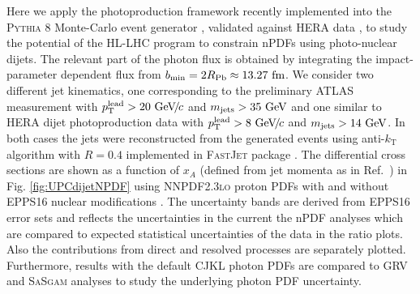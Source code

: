 \documentclass[../report.tex]{subfiles}
\begin{document}
Here we apply the photoproduction framework recently implemented into the \textsc{Pythia 8} Monte-Carlo event generator \cite{Sjostrand:2014zea}, validated against HERA data \cite{Helenius:2018bai}, to study the potential of the HL-LHC program to constrain nPDFs using photo-nuclear dijets. The relevant part of the photon flux is obtained by integrating the impact-parameter dependent flux from $b_{\mathrm{min}}=2 R_{\mathrm{Pb}} \approx 13.27~\text{fm}$. We consider two different jet kinematics, one corresponding to the preliminary ATLAS measurement \cite{ATLAS:2017kwa} with $p_{\mathrm{T}}^{\mathrm{lead}}>20~\text{GeV}\!/\mspace{-2mu}c$ and $m_{\mathrm{jets}} > 35~\text{GeV}$ and one similar to HERA dijet photoproduction data with $p_{\mathrm{T}}^{\mathrm{lead}}>8~\text{GeV}\!/\mspace{-2mu}c$ and $m_{\mathrm{jets}} > 14~\text{GeV}$. In both cases the jets were reconstructed from the generated events using anti-$k_{\mathrm{T}}$ algorithm with $R = 0.4$ implemented in \textsc{FastJet} package \cite{Cacciari:2011ma}. The differential cross sections are shown as a function of $x_A$ (defined from jet momenta as in Ref.~\cite{ATLAS:2017kwa}) in Fig. \ref{fig:UPCdijetNPDF} using \textsc{NNPDF2.3lo} proton PDFs \cite{Ball:2012cx} with and without EPPS16 nuclear modifications \cite{Eskola:2016oht}. The uncertainty bands are derived from EPPS16 error sets and reflects the uncertainties in the current the nPDF analyses which are compared to expected statistical uncertainties of the data in the ratio plots. Also the contributions from direct and resolved processes are separately plotted. Furthermore, results with the default CJKL photon PDFs \cite{Cornet:2002iy} are compared to GRV \cite{Gluck:1991jc} and \textsc{SaSgam} \cite{Schuler:1995fk} analyses to study the underlying photon PDF uncertainty.
\end{document}
